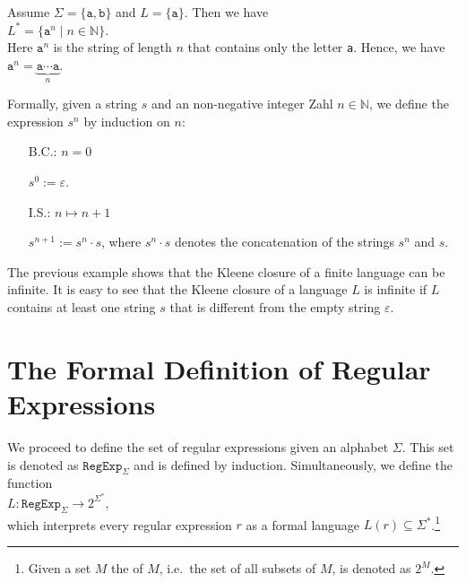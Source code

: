 \exampleEng
Assume $\Sigma = \{ \texttt{a}, \texttt{b} \}$ and  $L = \{ \texttt{a} \}$.  Then we have
\\[0.2cm]
\hspace*{1.3cm}
$L^* = \{ \texttt{a}^n \mid n \in \mathbb{N} \}$.
\\[0.2cm]
Here $\texttt{a}^n$ is the string of length $n$ that contains only the letter \texttt{a}.  Hence, we have 
\\[0.2cm]
\hspace*{1.3cm}
$\texttt{a}^n = \underbrace{\texttt{a} \cdots \texttt{a}}_n$.  \eox 


Formally, given a string $s$ and an non-negative integer Zahl $n \in \mathbb{N}$, we define the expression
 $s^n$ by induction on  $n$:
\begin{enumerate}
\item[B.C.:] $n = 0$

             $s^0 := \varepsilon$. 
\item[I.S.:] $n \mapsto n + 1$

             $s^{n+1} := s^n\cdot s$, \quad where $s^n \cdot s$ denotes the concatenation of the strings $s^n$ and $s$.
             \eox
\end{enumerate}

The previous example shows that the Kleene closure of a finite language can be infinite.
It is easy to see that the Kleene closure of a language $L$ is infinite
if $L$ contains at least one string $s$ that is different from the empty string $\varepsilon$.
\vspace*{0.3cm}

\section{The Formal Definition of Regular Expressions}
We proceed to define the set of regular expressions given an  alphabet $\Sigma$.  This set is
denoted as $\texttt{RegExp}_\Sigma$  
and is defined by induction.  Simultaneously,  we define
the function
\\[0.2cm]
\hspace*{1.3cm}
$L: \texttt{RegExp}_\Sigma \rightarrow 2^{\Sigma^*}$,
\\[0.2cm]
which interprets every regular expression  $r$ as a formal language $L(r) \subseteq \Sigma^*$.\footnote{
  Given a set $M$ the   of $M$, i.e.~the set of all subsets of $M$, is denoted
  as $2^M$.  
}

